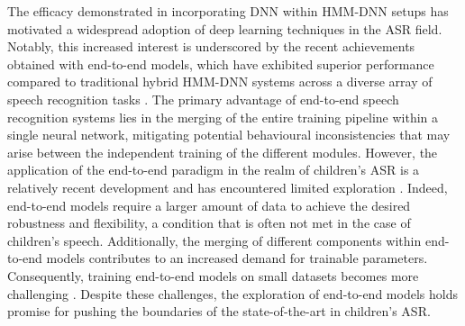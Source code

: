 \label{chap:4}
\cleardoublepage
The efficacy demonstrated in incorporating \ac{DNN} within \ac{HMM-DNN} setups has motivated a widespread adoption of deep learning techniques in the \ac{ASR} field. Notably, this increased interest is underscored by the recent achievements obtained with end-to-end models, which have exhibited superior performance compared to traditional hybrid \ac{HMM-DNN} systems across a diverse array of speech recognition tasks \cite{zeyer2019comparison,zeineldeen2022Conformer}.
The primary advantage of end-to-end speech recognition systems lies in the merging of the entire training pipeline within a single neural network, mitigating potential behavioural inconsistencies that may arise between the independent training of the different modules.
However, the application of the end-to-end paradigm in the realm of children's \ac{ASR} is a relatively recent development and has encountered limited exploration \cite{gelin2021endtoend,sri_end2end,chen2020data,ng2020cuhk}. Indeed, end-to-end models require a larger amount of data to achieve the desired robustness and flexibility, a condition that is often not met in the case of children's speech. Additionally, the merging of different components within end-to-end models contributes to an increased demand for trainable parameters. Consequently, training end-to-end models on small datasets becomes more challenging \cite{luscher2019rwth}. Despite these challenges, the exploration of end-to-end models holds promise for pushing the boundaries of the state-of-the-art in children's \ac{ASR}.



